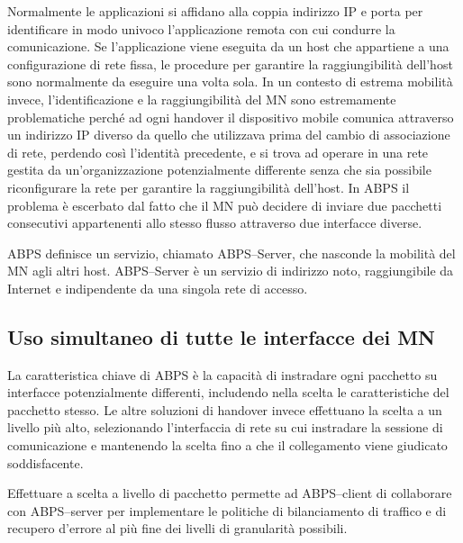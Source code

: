 \documentclass[12pt,a4paper,openright,twoside]{book}
\begin{document}
Normalmente le applicazioni si affidano alla coppia indirizzo IP e
porta per identificare in modo univoco l'applicazione remota con cui
condurre la comunicazione. Se l'applicazione viene eseguita da un host
che appartiene a una configurazione di rete fissa, le procedure per
garantire la raggiungibilità dell'host sono normalmente da eseguire
una volta sola. In un contesto di estrema mobilità invece,
l'identificazione e la raggiungibilità del MN sono estremamente
problematiche perché ad ogni handover il dispositivo mobile comunica
attraverso un indirizzo IP diverso da quello che utilizzava prima del
cambio di associazione di rete, perdendo così l'identità precedente, e
si trova ad operare in una rete gestita da un'organizzazione
potenzialmente differente senza che sia possibile riconfigurare la
rete per garantire la raggiungibilità dell'host. In ABPS il problema è
escerbato dal fatto che il MN può decidere di inviare due pacchetti
consecutivi appartenenti allo stesso flusso attraverso due interfacce
diverse.

ABPS definisce un servizio, chiamato ABPS--Server, che nasconde la
mobilità del MN agli altri host. ABPS--Server è un servizio di
indirizzo noto, raggiungibile da Internet e indipendente da una
singola rete di accesso.

\subsection{Uso simultaneo di tutte le interfacce dei MN}
La caratteristica chiave di ABPS è la capacità di instradare ogni
pacchetto su interfacce potenzialmente differenti, includendo nella
scelta le caratteristiche del pacchetto stesso. Le altre soluzioni di
handover invece effettuano la scelta a un livello più alto,
selezionando l'interfaccia di rete su cui instradare la sessione di
comunicazione e mantenendo la scelta fino a che il collegamento viene
giudicato soddisfacente.

Effettuare a scelta a livello di pacchetto permette ad ABPS--client di
collaborare con ABPS--server per implementare le politiche di
bilanciamento di traffico e di recupero d'errore al più fine dei
livelli di granularità possibili.
\end{document}
